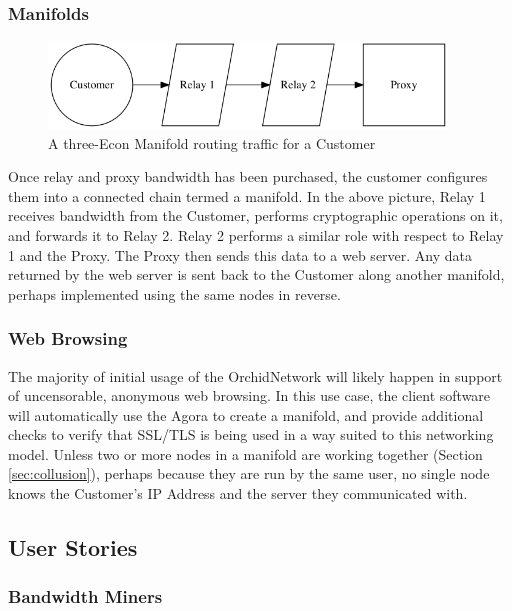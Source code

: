\documentclass{article}
\newcommand{\orchid}{Orchid}
\newcommand{\Orchid}{\orchid}
\begin{document}
\subsubsection{Manifolds}

\begin{figure}[htbp]
  \centering
  \includegraphics[width = 300pt]{sttc}
  \caption{A three-Econ Manifold routing traffic for a Customer}
\end{figure}

Once relay and proxy bandwidth has been purchased, the customer configures them into a connected chain termed a manifold. In the above picture, Relay 1 receives bandwidth from the Customer, performs cryptographic operations on it, and forwards it to Relay 2. Relay 2 performs a similar role with respect to Relay 1 and the Proxy. The Proxy then sends this data to a web server. Any data returned by the web server is sent back to the Customer along another manifold, perhaps implemented using the same nodes in reverse.

\subsubsection{Web Browsing}

The majority of initial usage of the \Orchid Network will likely happen in support of uncensorable, anonymous web browsing. In this use case, the client software will automatically use the Agora to create a manifold, and provide additional checks to verify that SSL/TLS is being used in a way suited to this networking model. Unless two or more nodes in a manifold are working together (Section \ref{sec:collusion}), perhaps because they are run by the same user, no single node knows the Customer's IP Address and the server they communicated with.

\subsection{User Stories}

\subsubsection{Bandwidth Miners}
\end{document}

